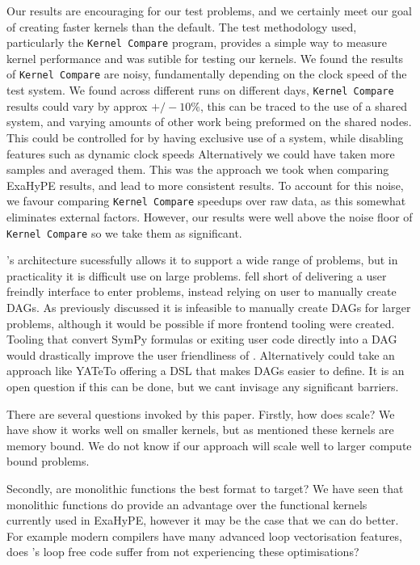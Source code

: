 Our results are encouraging for our test problems, and we certainly meet our goal of creating faster kernels than the default.
The test methodology used, particularly the \texttt{Kernel Compare} program, provides a simple way to measure kernel performance and was sutible for testing our kernels.
We found the results of \texttt{Kernel Compare} are noisy, fundamentally depending on the clock speed of the test system.
We found across different runs on different days, \texttt{Kernel Compare} results could vary by approx $+/-10\%$, this can be traced to the use of a shared system, and varying amounts of other work being preformed on the shared nodes.
This could be controlled for by having exclusive use of a system, while disabling features such as dynamic clock speeds
Alternatively we could have taken more samples and averaged them.
This was the approach we took when comparing ExaHyPE results, and lead to more consistent results.
To account for this noise, we favour comparing \texttt{Kernel Compare} speedups over raw data, as this somewhat eliminates external factors.
However, our results were well above the noise floor of \texttt{Kernel Compare} so we take them as significant.

\phlat{}'s architecture sucessfully allows it to support a wide range of problems, but in practicality it is difficult use \phlat on large problems.
\phlat fell short of delivering a user freindly interface to enter problems, instead relying on user to manually create DAGs.
As previously discussed it is infeasible to manually create DAGs for larger problems, although it would be possible if more frontend tooling were created.
Tooling that convert SymPy formulas \cite{sympy} or exiting user code directly into a DAG would drastically improve the user friendliness of \phlat.
Alternatively \phlat could take an approach like YATeTo offering a DSL that makes DAGs easier to define.
It is an open question if this can be done, but we cant invisage any significant barriers.

There are several questions invoked by this paper.
Firstly, how does \phlat scale?
We have show it works well on smaller kernels, but as mentioned these kernels are memory bound.
We do not know if our approach will scale well to larger compute bound problems.

Secondly, are monolithic functions the best format to target?
We have seen that monolithic functions do provide an advantage over the functional kernels currently used in ExaHyPE, however it may be the case that we can do better.
For example modern compilers have many advanced loop vectorisation features, does \phlat{}'s loop free code suffer from not experiencing these optimisations?

